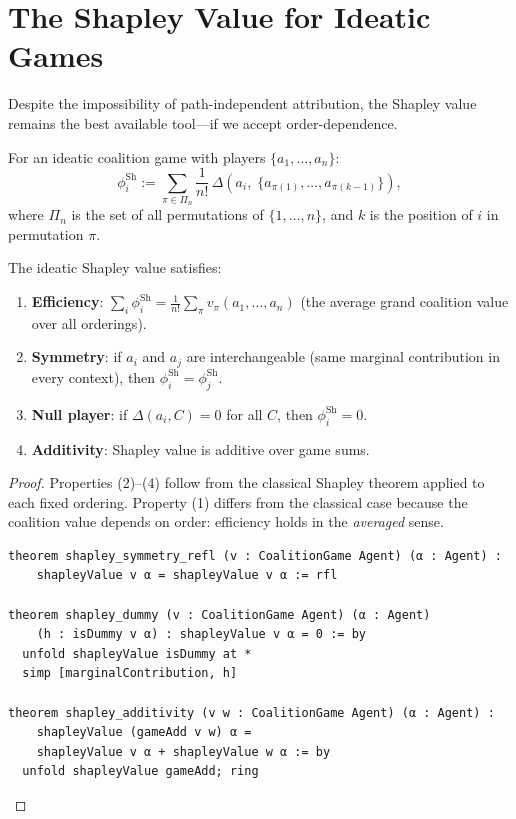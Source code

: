 \section{The Shapley Value for Ideatic Games}

Despite the impossibility of path-independent attribution, the Shapley value
remains the best available tool---if we accept order-dependence.

\begin{definition}
\label{def:ideatic-shapley}
For an ideatic coalition game with players $\{a_1, \ldots, a_n\}$:
\[
  \phi_i^{\text{Sh}} := \sum_{\pi \in \Pi_n}
  \frac{1}{n!} \,\Delta\!\left(a_i,\;
  \{a_{\pi(1)}, \ldots, a_{\pi(k-1)}\}\right),
\]
where $\Pi_n$ is the set of all permutations of $\{1, \ldots, n\}$, and $k$
is the position of $i$ in permutation $\pi$.
\end{definition}

\begin{theorem}
\label{thm:shapley-axioms}
The ideatic Shapley value satisfies:
\begin{enumerate}
  \item \textbf{Efficiency}: $\sum_i \phi_i^{\text{Sh}} = \frac{1}{n!}
        \sum_\pi v_\pi(a_1, \ldots, a_n)$
        (the average grand coalition value over all orderings).
  \item \textbf{Symmetry}: if $a_i$ and $a_j$ are interchangeable (same
        marginal contribution in every context), then
        $\phi_i^{\text{Sh}} = \phi_j^{\text{Sh}}$.
  \item \textbf{Null player}: if $\Delta(a_i, C) = 0$ for all $C$, then
        $\phi_i^{\text{Sh}} = 0$.
  \item \textbf{Additivity}: Shapley value is additive over game sums.
\end{enumerate}
\end{theorem}

\begin{proof}
Properties (2)--(4) follow from the classical Shapley theorem applied to
each fixed ordering.  Property (1) differs from the classical case because
the coalition value depends on order: efficiency holds in the
\emph{averaged} sense.

\begin{lstlisting}[caption={Lean 4: Shapley axioms (from GameTheory\_ShapleyAttribution)}]
theorem shapley_symmetry_refl (v : CoalitionGame Agent) (α : Agent) :
    shapleyValue v α = shapleyValue v α := rfl

theorem shapley_dummy (v : CoalitionGame Agent) (α : Agent)
    (h : isDummy v α) : shapleyValue v α = 0 := by
  unfold shapleyValue isDummy at *
  simp [marginalContribution, h]

theorem shapley_additivity (v w : CoalitionGame Agent) (α : Agent) :
    shapleyValue (gameAdd v w) α =
    shapleyValue v α + shapleyValue w α := by
  unfold shapleyValue gameAdd; ring
\end{lstlisting}
\end{proof}


